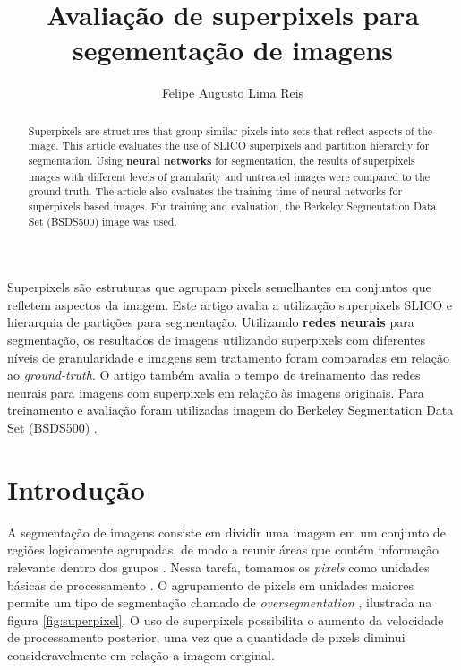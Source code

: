 \title{Avaliação de superpixels para segementação de imagens}
\author{Felipe Augusto Lima Reis\inst{1}}
\begin{document}
 

\maketitle

\begin{abstract}
  Superpixels are structures that group similar pixels into sets that reflect aspects of the image. This article evaluates the use of SLICO superpixels and partition hierarchy for segmentation. Using \textbf{neural networks} for segmentation, the results of superpixels images with different levels of granularity and untreated images were compared to the ground-truth. The article also evaluates the training time of neural networks for superpixels based images. For training and evaluation, the Berkeley Segmentation Data Set (BSDS500) \cite{BSDS500} image was used.
\end{abstract}
     
\begin{resumo} 
  Superpixels são estruturas que agrupam pixels semelhantes em conjuntos que refletem aspectos da imagem. Este artigo avalia a utilização superpixels SLICO e hierarquia de partições para segmentação. Utilizando \textbf{redes neurais} para segmentação, os resultados de imagens utilizando superpixels com diferentes níveis de granularidade e imagens sem tratamento foram comparadas em relação ao \textit{ground-truth}. O artigo também avalia o tempo de treinamento das redes neurais para imagens com superpixels em relação às imagens originais. Para treinamento e avaliação foram utilizadas imagem do Berkeley Segmentation Data Set (BSDS500) \cite{BSDS500}.
\end{resumo}


\section{Introdução} \label{sec:introducao}

A segmentação de imagens consiste em dividir uma imagem em um conjunto de regiões logicamente agrupadas, de modo a reunir áreas que contém informação relevante dentro dos grupos \cite{DOMINGUEZ}. Nessa tarefa, tomamos os \textit{pixels} como unidades básicas de processamento \cite{WANG201728}. O agrupamento de pixels em unidades maiores permite um tipo de segmentação chamado de \textit{oversegmentation} \cite{WANG201728}, ilustrada na figura \ref{fig:superpixel}. O uso de superpixels possibilita o aumento da velocidade de processamento posterior, uma vez que a quantidade de pixels diminui consideravelmente em relação a imagem original.
\end{document}
